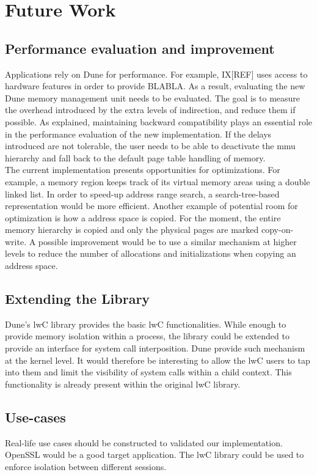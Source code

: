 \chapter{Future Work}



\section{Performance evaluation and improvement}
Applications rely on Dune for performance.
For example, IX[REF] uses access to hardware features in order to provide BLABLA.
As a result, evaluating the new Dune memory management unit needs to be evaluated.
The goal is to measure the overhead introduced by the extra levels of indirection, and reduce them if possible.
As explained, maintaining backward compatibility plays an essential role in the performance evaluation of the new implementation.
If the delays introduced are not tolerable, the user needs to be able to deactivate the mmu hierarchy and fall back to the default page table handling of memory.\\
The current implementation presents opportunities for optimizations.
For example, a memory region keeps track of its virtual memory areas using a double linked list.
In order to speed-up address range search, a search-tree-based representation would be more efficient.
Another example of potential room for optimization is how a address space is copied.
For the moment, the entire memory hierarchy is copied and only the physical pages are marked copy-on-write.
A possible improvement would be to use a similar mechanism at higher levels to reduce the number of allocations and initializations when copying an address space.

\section{Extending the Library}
Dune's lwC library provides the basic lwC functionalities.
While enough to provide memory isolation within a process, the library could be extended to provide an interface for system call interposition.
Dune provide such mechanism at the kernel level.
It would therefore be interesting to allow the lwC users to tap into them and limit the visibility of system calls within a child context.
This functionality is already present within the original lwC library.

\section{Use-cases}
Real-life use cases should be constructed to validated our implementation.
OpenSSL would be a good target application.
The lwC library could be used to enforce isolation between different sessions.